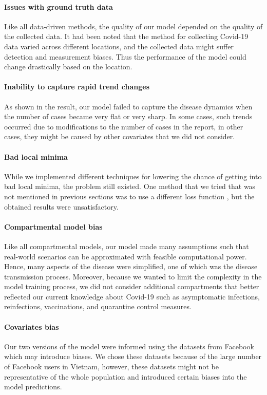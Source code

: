 \paragraph{Issues with ground truth data}
Like all data-driven methods, the quality of our model depended on the quality of the collected data.
It had been noted that the method for collecting Covid-19 data varied across different locations, and the collected data might suffer detection and measurement biases.
Thus the performance of the model could change drastically based on the location.

\paragraph{Inability to capture rapid trend changes}
As shown in the result, our model failed to capture the disease dynamics when the number of cases became very flat or very sharp.
In some cases, such trends occurred due to modifications to the number of cases in the report, in other cases, they might be caused by other covariates that we did not consider.

\paragraph{Bad local minima}
While we implemented different techniques for lowering the chance of getting into bad local minima, the problem still existed.
One method that we tried that was not mentioned in previous sections was to use a different loss function \cite{vortmeyer-kleyTrajectorybasedLossFunction2021}, but the obtained results were unsatisfactory.

\paragraph{Compartmental model bias}
Like all compartmental models, our model made many assumptions such that real-world scenarios can be approximated with feasible computational power.
Hence, many aspects of the disease were simplified, one of which was the disease transmission process.
Moreover, because we wanted to limit the complexity in the model training process, we did not consider additional compartments that better reflected our current knowledge about Covid-19 such as asymptomatic infections, reinfections, vaccinations, and quarantine control measures.

\paragraph{Covariates bias}
Our two versions of the model were informed using the datasets from Facebook which may introduce biases.
We chose these datasets because of the large number of Facebook users in Vietnam, however, these datasets might not be representative of the whole population and introduced certain biases into the model predictions.

